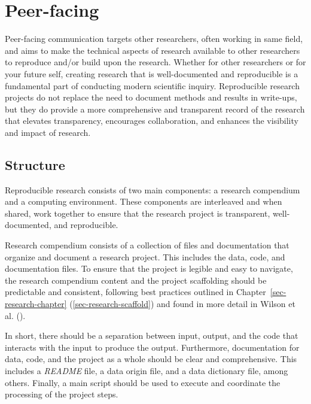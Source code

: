 \documentclass[
  letterpaper,
  krantz1]{latex/krantz-mod}
\theoremstyle{definition}
\theoremstyle{definition}
\theoremstyle{remark}
\begin{document}
\section{Peer-facing}\label{sec-contribute-peer-facing}

Peer-facing communication targets other researchers, often working in
same field, and aims to make the technical aspects of research available
to other researchers to reproduce and/or build upon the research.
Whether for other researchers or for your future self, creating research
that is well-documented and reproducible is a fundamental part of
conducting modern scientific inquiry. Reproducible research projects do
not replace the need to document methods and results in write-ups, but
they do provide a more comprehensive and transparent record of the
research that elevates transparency, encourages collaboration, and
enhances the visibility and impact of research.

\subsection{Structure}\label{sec-contribute-peer-structure}

Reproducible research consists of two main components: a research
compendium and a computing environment. These components are interleaved
and when shared, work together to ensure that the research project is
transparent, well-documented, and reproducible.

Research compendium consists of a collection
of files and documentation that organize and document a research
project. This includes the data, code, and documentation files. To
ensure that the project is legible and easy to navigate, the research
compendium content and the project scaffolding should be predictable and
consistent, following best practices outlined in
Chapter~\ref{sec-research-chapter} (\ref{sec-research-scaffold}) and
found in more detail in Wilson et al. ().

In short, there should be a separation between input, output, and the
code that interacts with the input to produce the output. Furthermore,
documentation for data, code, and the project as a whole should be clear
and comprehensive. This includes a \emph{README} file, a data
origin file, and a data
dictionary file, among others. Finally, a main
script should be used to execute and coordinate the processing of the
project steps.
\end{document}
